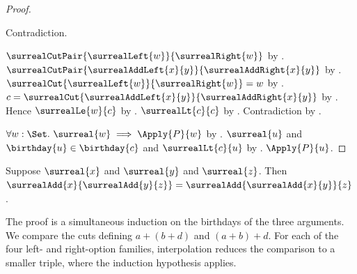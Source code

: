 \begin{proof}
\begin{subproof}
\begin{subproof}
\begin{subproof}
\begin{byCase}
\begin{byCase}
                            Contradiction.
                    \end{byCase}
            \end{byCase}
        \end{subproof}
        $$
            by .
        $
            {}$
            by .
        $=w$
            by .
        $c=
            {}$
            by .
        Hence $$
            by .
        $$
            by .
        Contradiction by .
        \end{subproof}
    \end{subproof}
    $\forall w:\Set.\ \implies{}$
        by .
    $$ and $\in{}$ and
        $$
        by .
    $$.
\end{proof}

\begin{theorem}\label{surreal_add_associative}
    Suppose $$ and $$ and $$.
    Then $=
        $.
\end{theorem}

The proof is a simultaneous induction on the birthdays of the three
arguments. We compare the cuts defining $a+(b+d)$ and $(a+b)+d$.
For each of the four left- and right-option families, interpolation
reduces the comparison to a smaller triple, where the induction
hypothesis applies.

